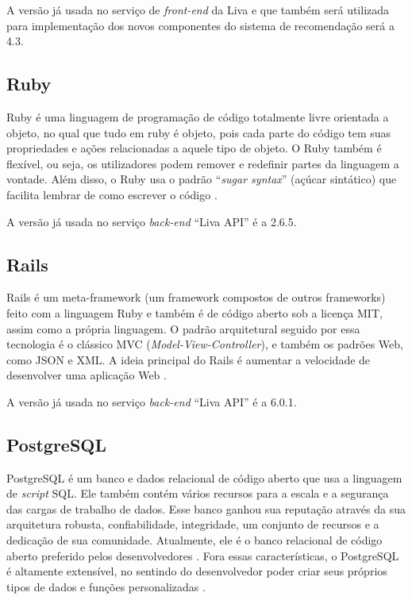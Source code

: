 A versão já usada no serviço de \textit{front-end} da Liva e que também será utilizada para implementação dos novos componentes do sistema de recomendação será a 4.3.

\subsection{Ruby}

Ruby é uma linguagem de programação de código totalmente livre orientada a objeto, no qual que tudo em ruby é objeto, pois cada parte do código tem suas propriedades e ações relacionadas a aquele tipo de objeto. O Ruby também é flexível, ou seja, os utilizadores podem remover e redefinir partes da linguagem a vontade. Além disso, o Ruby usa o padrão “\textit{sugar syntax}” (açúcar sintático) que facilita lembrar de como escrever o código \cite{ruby:2019}.

A versão já usada no serviço \textit{back-end} “Liva API” é a 2.6.5.

\subsection{Rails}

Rails é um meta-framework (um framework compostos de outros frameworks) feito com a linguagem Ruby e também é de código aberto sob a licença MIT, assim como a própria linguagem. O padrão arquitetural seguido por essa tecnologia é o clássico MVC (\textit{Model-View-Controller}), e também os padrões Web, como JSON e XML. A ideia principal do Rails é aumentar a velocidade de desenvolver uma aplicação Web \cite{portalgsti:2019}.

A versão já usada no serviço \textit{back-end} “Liva API” é a 6.0.1.

\subsection{PostgreSQL}

PostgreSQL é um banco e dados relacional de código aberto que usa a linguagem de \textit{script} SQL. Ele também contém vários recursos para a escala e a segurança das cargas de trabalho de dados. Esse banco ganhou sua reputação através da sua arquitetura robusta, confiabilidade, integridade, um conjunto de recursos e a dedicação de sua comunidade. Atualmente, ele é o banco relacional de código aberto preferido pelos desenvolvedores \cite{postgres:2019}.
Fora essas características, o PostgreSQL é altamente extensível, no sentindo do desenvolvedor poder criar seus próprios tipos de dados e funções personalizadas \cite{postgres:2019}.

